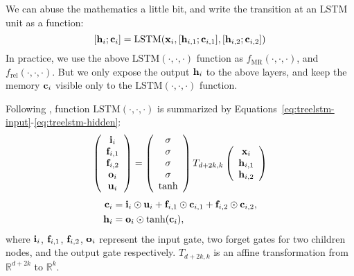 We can abuse the mathematics a little bit, 
and write the transition at an LSTM unit as a function:
\[
[\mathbf{h}_i; \mathbf{c}_i] = \mathrm{LSTM}(\mathbf{x}_i, [\mathbf{h}_{i,1}; \mathbf{c}_{i,1}], [\mathbf{h}_{i,2}; \mathbf{c}_{i,2}])
\label{eq:lstmdef}
\]
In practice, we use the above $\mathrm{LSTM}(\cdot, \cdot, \cdot)$ function as $f_{\text{MR}}(\cdot, \cdot, \cdot)$, and $f_{\text{rel}}(\cdot, \cdot, \cdot)$. But we only expose the output $\mathbf{h}_i$ 
to the above layers, and keep the memory $\mathbf{c}_i$ visible only
to the $\mathrm{LSTM}(\cdot, \cdot, \cdot)$ function.

Following , 
function $\mathrm{LSTM}(\cdot, \cdot, \cdot)$ is summarized by 
Equations~\ref{eq:treelstm-input}-\ref{eq:treelstm-hidden}:
\begin{equation}
\left(
\begin{array}{c}
\mathbf{i}_i\\
\mathbf{f}_{i,1}\\
\mathbf{f}_{i,2}\\
\mathbf{o}_{i}\\
\mathbf{u}_{i}
\end{array}
\right) = \left(
\begin{array}{c}
\sigma\\
\sigma\\
\sigma\\
\sigma\\
\tanh
\end{array}
\right) T_{d+2k, k}
\left(\begin{array}{c}
\mathbf{x}_i\\
\mathbf{h}_{i,1}\\
\mathbf{h}_{i,2}
\end{array}
\right)
\label{eq:treelstm-input}
\end{equation}
\vspace{-0.7cm}
\begin{align}
\mathbf{c}_i & = \mathbf{i}_i \odot \mathbf{u}_i + \mathbf{f}_{i, 1} \odot \mathbf{c}_{i, 1}+ \mathbf{f}_{i, 2} \odot \mathbf{c}_{i, 2},\label{eq:treelstm-mem}\\
\mathbf{h}_i & = \mathbf{o}_i \odot \tanh(\mathbf{c}_i), \label{eq:treelstm-hidden}
\end{align}
where $\mathbf{i}_i$, $\mathbf{f}_{i,1}$, $\mathbf{f}_{i,2}$, $\mathbf{o}_i$ represent the
input gate, two forget gates for two children nodes, 
and the output gate respectively.
$T_{d+2k,k}$ is an affine transformation from $\mathbb{R}^{d+2k}$
to $\mathbb{R}^k$.

